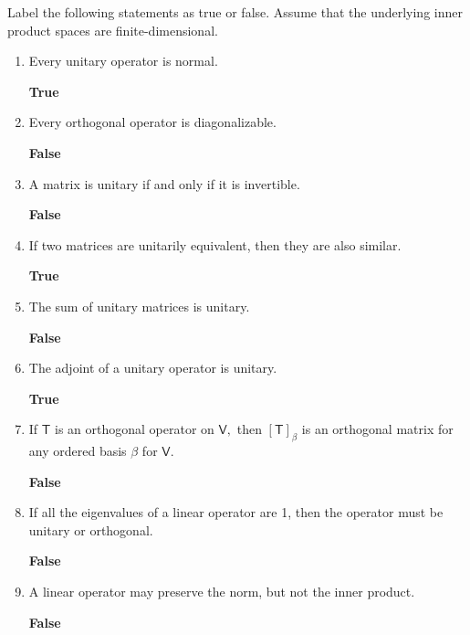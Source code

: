 Label the following statements as true or false. Assume that the
underlying inner product spaces are finite-dimensional.
\begin{enumerate}
\item Every unitary operator is normal.

{\bf True}
\item Every orthogonal operator is diagonalizable.

{\bf False}
\item A matrix is unitary if and only if it is invertible.

{\bf False}
\item If two matrices are unitarily equivalent, then they are also
  similar.

{\bf True}

\item The sum of unitary matrices is unitary.

{\bf False}
\item The adjoint of a unitary operator is unitary.

{\bf True}
\item If $\mathsf{T}$ is an orthogonal operator on $\mathsf{V},$ then
  $[\mathsf{T}]_\beta$ is an orthogonal matrix for any ordered basis
  $\beta$ for $\mathsf{V}.$ 

{\bf False}
\item If all the eigenvalues of a linear operator are 1, then the
  operator must be unitary or orthogonal.

{\bf False}
\item A linear operator may preserve the norm, but not the inner
  product.

{\bf False}
\end{enumerate}
